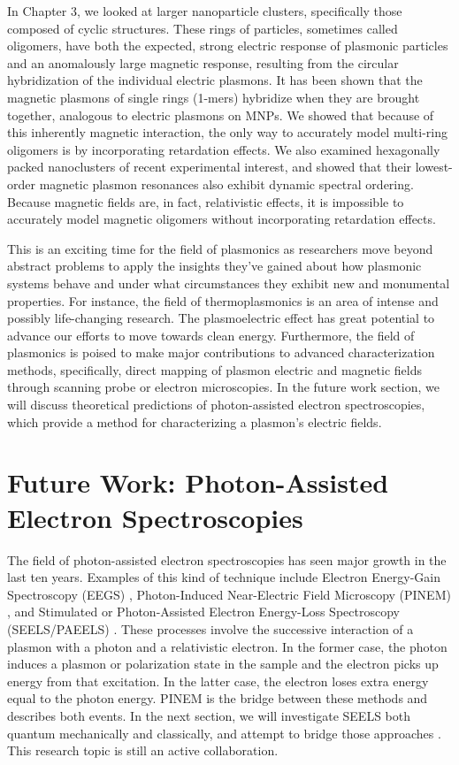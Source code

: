 \documentclass [11pt, proquest] {uwthesis}[2016/11/22]
\begin{document}
In Chapter 3, we looked at larger nanoparticle clusters, specifically those composed of cyclic structures. These rings of particles, sometimes called oligomers, have both the expected, strong electric response of plasmonic particles and an anomalously large magnetic response, resulting from the circular hybridization of the individual electric plasmons. It has been shown that the magnetic plasmons of single rings (1-mers) hybridize when they are brought together, analogous to electric plasmons on MNPs. We showed that because of this inherently magnetic interaction, the only way to accurately model multi-ring oligomers is by incorporating retardation effects. We also examined hexagonally packed nanoclusters of recent experimental interest, and showed that their lowest-order magnetic plasmon resonances also exhibit dynamic spectral ordering. Because magnetic fields are, in fact, relativistic effects, it is impossible to accurately model magnetic oligomers without incorporating retardation effects.

This is an exciting time for the field of plasmonics as researchers move beyond abstract problems to apply the insights they've gained about how plasmonic systems behave and under what circumstances they exhibit new and monumental properties. For instance, the field of thermoplasmonics is an area of intense and possibly life-changing research. The plasmoelectric effect has great potential to advance our efforts to move towards clean energy. Furthermore, the field of plasmonics is poised to make major contributions to advanced characterization methods, specifically, direct mapping of plasmon electric and magnetic fields through scanning probe or electron microscopies. In the future work section, we will discuss theoretical predictions of photon-assisted electron spectroscopies, which provide a method for characterizing a plasmon's electric fields.

\section{Future Work: Photon-Assisted Electron Spectroscopies}

The field of photon-assisted electron spectroscopies has seen major growth in the last ten years. Examples of this kind of technique include Electron Energy-Gain Spectroscopy (EEGS) \cite{EEGS}, Photon-Induced Near-Electric Field Microscopy (PINEM) \cite{PINEM}, and Stimulated or Photon-Assisted Electron Energy-Loss Spectroscopy (SEELS/PAEELS) \cite{EEGS,vanAiken}. These processes involve the successive interaction of a plasmon with a photon and a relativistic electron. In the former case, the photon induces a plasmon or polarization state in the sample and the electron picks up energy from that excitation. In the latter case, the electron loses extra energy equal to the photon energy. PINEM is the bridge between these methods and describes both events. In the next section, we will investigate SEELS both quantum mechanically and classically, and attempt to bridge those approaches \cite{AbajoRevMod,vanAiken,EEGS}. This research topic is still an active collaboration.
\end{document}
